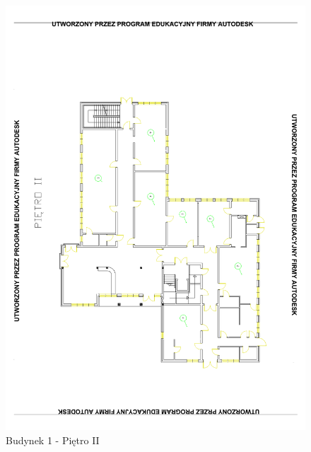 \begin{figure}[H]
  \begin{center}
    \includegraphics[width=\textwidth]{img/b1-2.pdf}
    \caption{Budynek 1 - Piętro II}
  \end{center}
\end{figure}

